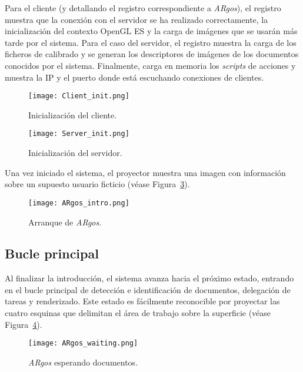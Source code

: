 Para el cliente (y detallando el registro correspondiente a \textit{ARgos}), el registro muestra que la conexión con el servidor se ha realizado correctamente, la inicialización del contexto OpenGL ES y la carga de imágenes que se usarán más tarde por el sistema. Para el caso del servidor, el registro muestra la carga de los ficheros de calibrado y se generan los descriptores de imágenes de los documentos conocidos por el sistema. Finalmente, carga en memoria los \textit{scripts} de acciones y muestra la IP y el puerto donde está escuchando conexiones de clientes.

\begin{figure}[!h]
  \begin{center}
    \texttt{[image: Client\_init.png]}
    \caption{Inicialización del cliente.}
    \label{fig:Client_init}
  \end{center}
\end{figure}

\begin{figure}[!h]
  \begin{center}
    \texttt{[image: Server\_init.png]}
    \caption{Inicialización del servidor.}
    \label{fig:Server_init}
  \end{center}
\end{figure}

Una vez iniciado el sistema, el proyector muestra una imagen con información sobre un supuesto usuario ficticio (véase Figura~\ref{fig:ARgos_intro}).

\begin{figure}
  \begin{center}
    \texttt{[image: ARgos\_intro.png]}
    \caption{Arranque de \textit{ARgos}.}
    \label{fig:ARgos_intro}
  \end{center}
\end{figure}

\subsection{Bucle principal}
Al finalizar la introducción, el sistema avanza hacia el próximo estado, entrando en el bucle principal de detección e identificación de documentos, delegación de tareas y renderizado. Este estado es fácilmente reconocible por proyectar las cuatro esquinas que delimitan el área de trabajo sobre la superficie (véase Figura~\ref{fig:ARgos_waiting}).

\begin{figure}
  \begin{center}
    \texttt{[image: ARgos\_waiting.png]}
    \caption{\textit{ARgos} esperando documentos.}
    \label{fig:ARgos_waiting}
  \end{center}
\end{figure}

